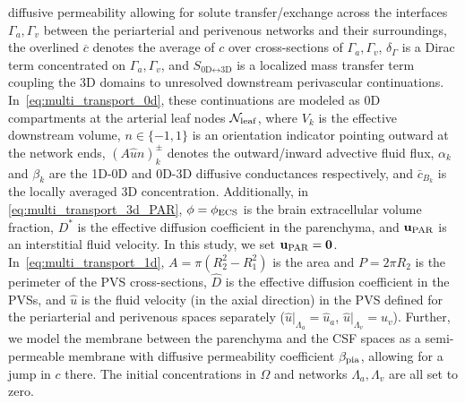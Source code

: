 \documentclass[fleqn,10pt]{wlscirep}
\begin{document}
diffusive permeability allowing for solute transfer/exchange across
the interfaces $\Gamma_a, \Gamma_v$ between the periarterial and
perivenous networks and their surroundings, the overlined
$\overline{c}$ denotes the average of $c$ over cross-sections of
$\Gamma_a, \Gamma_v$, $\delta_{\Gamma}$ is a Dirac term
concentrated on $\Gamma_a, \Gamma_v$, and $S_{\text{0D} \leftrightarrow \text{3D}}$ is a localized mass transfer term coupling the 3D domains to unresolved downstream perivascular continuations. 
In~\eqref{eq:multi_transport_0d}, 
these continuations are modeled as 0D compartments at the arterial leaf nodes 
$\mathcal{N}_{\rm leaf}$, where $V_k$ is the effective downstream volume, $n \in \{-1, 1\}$ is an orientation indicator pointing outward at the network ends, $(A \hat{u} n)^{\pm}_k$ denotes the outward/inward advective 
fluid flux, $\alpha_k$ and $\beta_k$ are the 
1D-0D and 0D-3D diffusive conductances respectively, and $\bar{c}_{B_k}$ is 
the locally averaged 3D concentration.
Additionally, in \eqref{eq:multi_transport_3d_PAR}, $\phi = \phi_{\rm ECS}$ is the
brain extracellular volume fraction, $D^{\ast}$ is the effective
diffusion coefficient in the parenchyma, and $\mathbf{u}_{\rm PAR}$ is an
interstitial fluid velocity. In this study, we set $\mathbf{u}_{\rm PAR} = \mathbf{0}$. In~\eqref{eq:multi_transport_1d}, $A = \pi (R_2^2 - R_1^2)$ is the
area and $P = 2 \pi R_2$ is the perimeter of the PVS cross-sections,
$\hat{D}$ is the effective diffusion coefficient in the PVSs, and
$\hat{u}$ is the fluid velocity (in the axial direction) in the PVS
defined for the periarterial and perivenous spaces separately
($\hat{u}|_{\Lambda_a} = \hat{u}_a$, $\hat{u}|_{\Lambda_v} =
\hat{u}_v$). Further, we model the membrane between the parenchyma and
the CSF spaces as a semi-permeable membrane with diffusive
permeability coefficient $\beta_{\rm pia}$, allowing for a jump in $c$
there. The initial concentrations in $\Omega$ and networks $\Lambda_a,
\Lambda_v$ are all set to zero.

\end{document}
